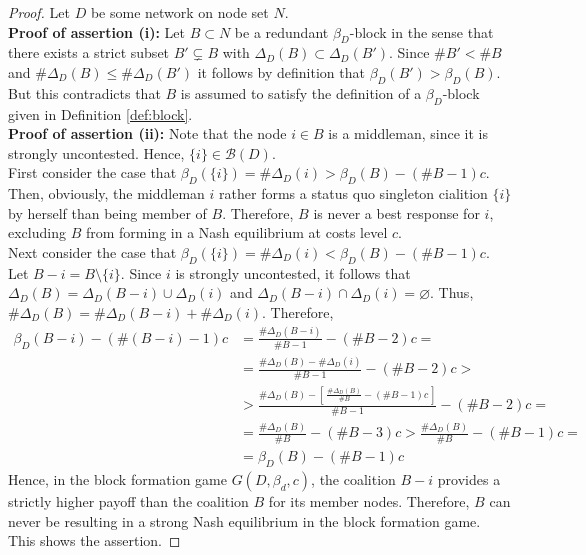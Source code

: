 \begin{proof}
Let $D$ be some network on node set $N$. \\[1ex]
\textbf{Proof of assertion (i):}
Let $B \subset N$ be a redundant $\beta_D$-block in the sense that there exists a strict subset $B' \subsetneq B$ with $\Delta_D (B) \subset \Delta_D (B')$. Since $\# B' < \# B$ and $\# \Delta_D (B) \leqslant \# \Delta_D (B')$ it follows by definition that $\beta_D (B') > \beta_D (B)$. But this contradicts that $B$ is assumed to satisfy the definition of a $\beta_D$-block given in Definition \ref{def:block}.
\\[1ex]
\textbf{Proof of assertion (ii):} Note that the node $i \in B$ is a middleman, since it is strongly uncontested. Hence, $\{ i \} \in \mathcal{B} (D)$.
\\
First consider the case that $\beta_D (\{ i \}) = \# \Delta_D (i) > \beta_D (B) - (\# B-1)c$. Then, obviously, the middleman $i$ rather forms a status quo singleton cialition $\{ i \}$ by herself than being member of $B$. Therefore, $B$ is never a best response for $i$, excluding $B$ from forming in a Nash equilibrium at costs level $c$.
\\
Next consider the case that $\beta_D (\{ i \}) = \# \Delta_D (i) < \beta_D (B) - (\# B-1)c$. Let $B-i = B \setminus \{ i\}$. Since $i$ is strongly uncontested, it follows that $\Delta_D (B) = \Delta_D (B-i) \cup \Delta_D (i)$ and $\Delta_D (B-i) \cap \Delta_D (i) = \varnothing$. Thus, $\# \Delta_D (B) = \# \Delta_D (B-i) + \# \Delta_D (i)$. Therefore,
\begin{align*}
\beta_D (B-i) - (\# (B-i) -1)c & = \frac{\# \Delta_D (B-i)}{\# B-1} - (\# B-2) c = \\[1ex]
 & = \frac{\# \Delta_D (B) - \# \Delta_D (i)}{\# B-1} - (\# B-2) c > \\[1ex]
 & > \frac{\# \Delta_D (B) - \left[ \, \tfrac{\# \Delta_D (B)}{\# B} - (\# B-1)c \, \right]}{\# B-1} - (\# B-2) c = \\[1ex]
 & = \frac{\# \Delta_D (B)}{\# B} - (\# B-3)c > \frac{\# \Delta_D (B)}{\# B} - (\# B-1)c = \\[1ex]
 & = \beta_D (B) - (\# B-1)c
\end{align*}
Hence, in the block formation game $G (D, \beta_d ,c)$, the coalition $B-i$ provides a strictly higher payoff than the coalition $B$ for its member nodes. Therefore, $B$ can never be resulting in a strong Nash equilibrium in the block formation game. This shows the assertion.
\end{proof}

